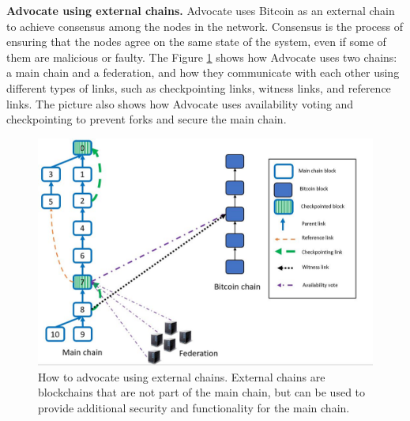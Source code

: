 \documentclass{report}
\begin{document}
\textbf{Advocate using external chains.} Advocate uses Bitcoin as an external chain to achieve consensus among the nodes in the network. Consensus is the process of ensuring that the nodes agree on the same state of the system, even if some of them are malicious or faulty. The Figure \ref{fig:f9} shows how Advocate uses two chains: a main chain and a federation, and how they communicate with each other using different types of links, such as checkpointing links, witness links, and reference links. The picture also shows how Advocate uses availability voting and checkpointing to prevent forks and secure the main chain.
\begin{figure}[h!]
	\centering
	\includegraphics[width=0.8\linewidth]{Fig/F9}
	\caption{How to advocate using external chains. External chains are blockchains that are not part of the main chain, but can be used to provide additional security and functionality for the main chain.}
	\label{fig:f9}
\end{figure}
\end{document}
